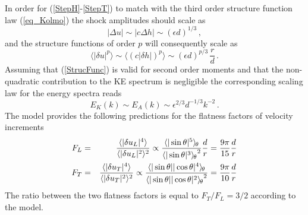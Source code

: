 \documentclass{jfm}
\newcommand{\meane}[1]{\langle #1 \rangle}
\newcommand{\meant}[1]{{\langle #1 \rangle_{\hspace{-0.4mm}\theta}}}
\begin{document}
In order for (\ref{StepH}-\ref{StepT}) to match with the third order structure function law (\ref{eq_Kolmo})  the shock amplitudes should scale as
\begin{equation} \label{Strength}
 | \Delta u | \sim | c \Delta h | \sim (\epsilon d)^{1/3} \, ,
\end{equation} 
and the structure functions of order $ p $ will consequently scale as
\begin{equation} \label{StrucFunc}
\meane{|\delta u |^p}  \sim \meane{(c|\delta h |)^p} \sim  (\epsilon  d)^{p/3} \,  \frac{r}{d} \, .
\end{equation} 
Assuming that (\ref{StrucFunc}) is valid for second order moments and that the non-quadratic contribution to the KE spectrum is negligible the corresponding scaling law for the energy spectra reads
\begin{equation} \label{Spectra}
E_K(k)  \sim  E_A(k) \sim \epsilon ^{2/3} d^{-1/3} k^{-2} \, .
\end{equation} 
The  model  provides the following predictions for the flatness factors of velocity increments
\begin{eqnarray} \label{FL}
F_L &=&  \frac{\meane{|\delta u_L|^4}}{\meane{|\delta u_L|^2}^2}
\propto 
\frac{\meant{|\sin\theta|^5}}{\meant{|\sin\theta|^3}^2} \frac{d}{r}   = \frac{9\pi}{15}  \frac{d}{r} \\ \label{FT}
F_T &=&  \frac{\meane{|\delta u_T|^4}}{\meane{|\delta u_T|^2}^2} 
\propto
\frac{\meant{|\sin\theta||\cos\theta|^4}}{\meant{|\sin\theta||\cos\theta|^2}^2} =  \frac{9\pi}{10}  \frac{d}{r} 
\end{eqnarray}
The ratio between the two flatness factors is equal  to
$F_T/F_L = 3/2$ according to the model. 
\end{document}
